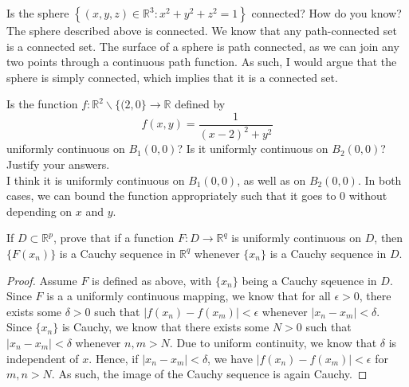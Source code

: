 \documentclass[12pt]{book}
\newcommand{\R}{\mathbb{R}}
\newenvironment{exercise}[2][Exercise]{\begin{trivlist}
\item[\hskip \labelsep {\bfseries #1}\hskip \labelsep {\bfseries #2.}]}{\end{trivlist}}
\begin{document}
\begin{exercise}{7.2.7}
\begin{exercise}{8.2.7}
Is the sphere $\left\{ (x,y,z) \in \R^3 : x^2 + y^2 + z^2 =1 \right\}$ connected? How do you know? \\

The sphere described above is connected. We know that any path-connected set is a connected set. The surface of a sphere is path connected, as we can join any two points through a continuous path function. As such, I would argue that the sphere is simply connected, which implies that it is a connected set.
\end{exercise}



\begin{exercise}{8.2.10}
Is the function $f: \R^2 \backslash \{ (2,0 \} \to \R$ defined  by
    \[ f(x,y) = \frac{1}{(x-2)^2 + y^2} \]
uniformly continuous on $B_1(0,0)$? Is it uniformly continuous on $B_2(0,0)$? Justify your answers. \\

I think it is uniformly continuous on $B_1 (0,0)$, as well as on $B_2 (0,0)$. In both cases, we can bound the function appropriately such that it goes to 0 without depending on $x$ and $y$.
\end{exercise}



\begin{exercise}{8.2.11}
If $D \subset \R^p$, prove that if a function $F:D \to \R^q$ is uniformly continuous on $D$, then $\{F(x_n)\}$ is a Cauchy sequence in $\R^q$ whenever $\{x_n\}$ is a Cauchy sequence in $D$.

\begin{proof}
    Assume $F$ is defined as above, with $\{x_n\}$ being a Cauchy sqeuence in $D$. Since $F$ is a a uniformly continuous mapping, we know that for all $\epsilon > 0$, there exists some $\delta>0$ such that $\left| f(x_n) - f(x_m) \right| < \epsilon$ whenever $ \left| x_n - x_m \right| < \delta$. Since $\{x_n\}$ is Cauchy, we know that there exists some $N>0$ such that $\left| x_n - x_m \right| < \delta$ whenever $n,m > N$. Due to uniform continuity, we know that $\delta$ is independent of $x$. Hence, if $\left| x_n - x_m \right| < \delta$, we have $\left| f(x_n) - f(x_m) \right| < \epsilon$ for $m,n > N$. As such, the image of the Cauchy sequence is again Cauchy.
\end{proof}
\end{exercise}





\end{exercise}
\end{document}
